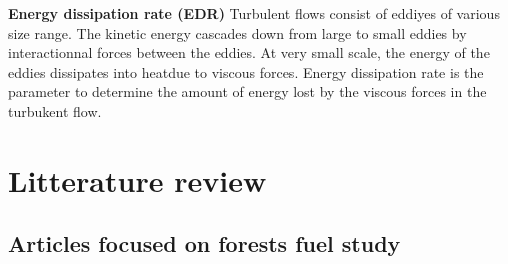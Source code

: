 \documentclass[12pt]{article}
\begin{document}
\vspace{0.5cm}
\textbf{Energy dissipation rate (EDR)}
Turbulent flows consist of eddiyes of various size range. The kinetic energy cascades down from large to small eddies by interactionnal forces between the eddies. At very small scale, the energy of the eddies dissipates into heatdue to viscous forces. Energy dissipation rate is the parameter to determine the amount of energy lost by the viscous forces in the turbukent flow. 

\section{Litterature review}

\vspace{0.5cm}

\subsection{Articles focused on forests fuel study}

\vspace{0.5cm}
\end{document}
